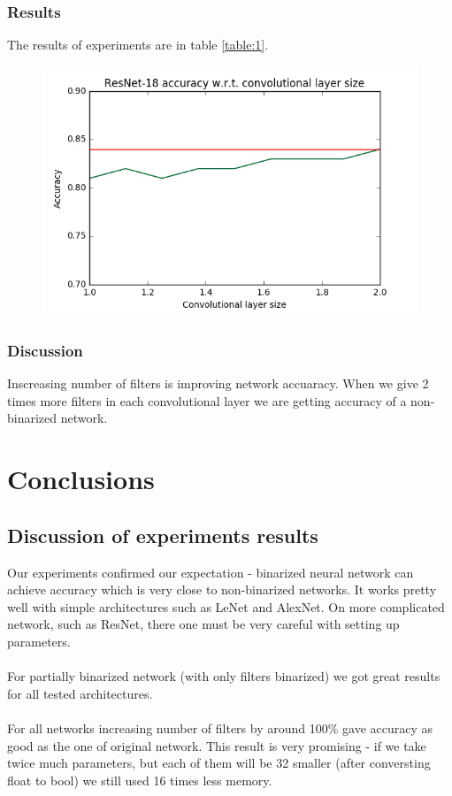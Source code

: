 \documentclass[licencjacka]{pracamgr}
\begin{document}
		\subsection{Results}
		 The results of experiments are in table \ref{table:1}.
		\begin{figure}[h]
				\centering
				\includegraphics[width=\textwidth]{images/filter-ratio}
			\end{figure}
		\subsection{Discussion}
			Inscreasing number of filters is improving network accuaracy. When we give 2 times more filters in each convolutional layer we are getting accuracy of a non-binarized network.

\chapter{Conclusions}
	\section{Discussion of experiments results}
		Our experiments confirmed our expectation - binarized neural network can achieve accuracy which is very close to non-binarized networks. It works pretty well with simple architectures such as LeNet and AlexNet. On more complicated network, such as ResNet, there one must be very careful with setting up parameters. 
		\\\\
		For partially binarized network (with only filters binarized) we got great results for all tested architectures.
		\\\\
		For all networks increasing number of filters by around 100\% gave accuracy as good as the one of original network. This result is very promising - if we take twice much parameters, but each of them will be 32 smaller (after conversting float to bool) we still used 16 times less memory.
\end{document}
